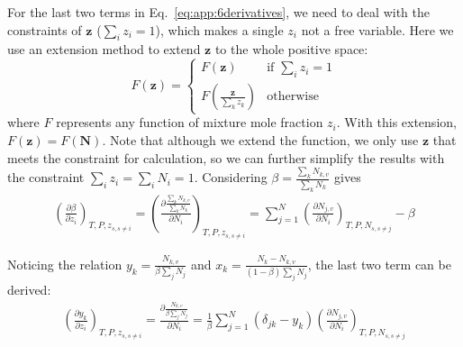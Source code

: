 For the last two terms in Eq.~\ref{eq:app:6derivatives}, we need to deal with the constraints of $\mathbf{z}$ ($\sum_i z_i =1$), which makes a single $z_i$ not a free variable. Here we use an extension method to extend $\mathbf{z}$ to the whole positive space:
\begin{equation}
	F(\mathbf{z}) =
	\begin{cases}
		F\left(\mathbf{z}\right)                    & \text{if }  \sum_i z_i =1 \\
		F\left(\frac{\mathbf{z}}{\sum_k z_k}\right) & \text{otherwise}
	\end{cases}
\end{equation}
where $F$ represents any function of mixture mole fraction $z_i$.  With this extension, $F(\mathbf{z}) = F(\mathbf{N})$.  Note that although we extend the function, we only use $\mathbf{z}$ that meets the constraint for calculation, so we can further simplify the results with the constraint $\sum_i z_i =\sum_i N_i = 1$.
Considering $\beta  = \frac{\sum_k N_{k,v}}{\sum_k N_k}$ gives
\begin{align}
	\left(\frac{\partial \beta}{\partial z_i}\right)_{T,P,z_{s,s\neq i}}=\left(\frac{\partial \frac{\sum_k N_{k,v}}{\sum_k N_{k}}}{\partial N_i}\right)_{T,P,z_{s,s\neq i}}=\sum_{j=1}^N\left(\frac{\partial N_{j,v}}{\partial N_i}\right)_{T,P,N_{s,s\neq j}} -\beta \label{eq:dbetadz}
\end{align}

Noticing the relation $y_k=\frac{N_{k,v}} { \beta \sum_j N_j}$ and $x_k=\frac{N_k-N_{k,v}} { (1-\beta) \sum_j N_j}$, the last two term can be derived:
\begin{align}\left(\frac{\partial y_k}{\partial z_i}\right)_{T,P,z_{s,s\neq i}}= \frac{\partial \frac{N_{k,v}} { \beta \sum_j N_j}}{\partial N_i}=\frac{1}{\beta} \sum_{j=1}^N\left(\delta _{jk}-y_k\right)\left(\frac{\partial N_{j,v}}{\partial N_i}\right)_{T,P,N_{s,s\neq j}}
\end{align}


